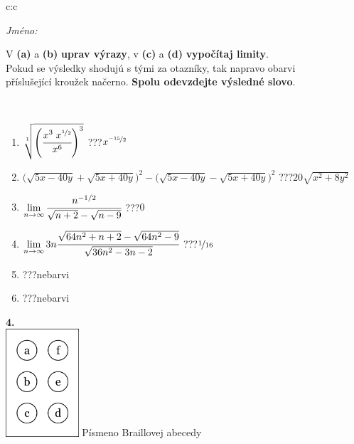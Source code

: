\documentclass[10pt]{report}
\begin{document}
\begin{tabular}{c:c}
\begin{minipage}[c][104.5mm][t]{0.5\linewidth}
\begin{center}
\textit{Jméno:}\phantom{xxxxxxxxxxxxxxxxxxxxxxxxxxxxxxxxxxxxxxxxxxxxxxxxxxxxxxxxxxxxxxxxx}\\[5mm]
\begin{minipage}{0.95\linewidth}
\begin{center}
V \textbf{(a)} a \textbf{(b)} \textbf{uprav výrazy}, v \textbf{(c)} a \textbf{(d)} \textbf{vypočítaj limity}.\\Pokud se výsledky shodujú s tými za otazníky, tak napravo obarvi\\příslušející kroužek načerno. \textbf{Spolu odevzdejte výsledné slovo}.
\end{center}
\end{minipage}
\\[1mm]
\begin{minipage}{0.79\linewidth}
\begin{center}
\begin{varwidth}{\linewidth}
\begin{enumerate}
\small
\item $\sqrt[1]{\left(\cfrac{x^{3}\;x^{\nicefrac{1}{2}}}{x^{6}}\right)^{3}}$\quad \dotfill\; ???\;\dotfill \quad $x^{\nicefrac{-15}{2}}$
\item {\footnotesize{\scriptsize$\big(\sqrt{5x-40y}+\sqrt{5x+40y}\big)^2-\big(\sqrt{5x-40y}-\sqrt{5x+40y}\big)^2$}\quad \dotfill\; ???\;\dotfill \quad $20\sqrt{x^2+8y^2}$}
\item $\lim\limits_{n\to\infty}\cfrac{n^{-1/2}}{\sqrt{n+2}-\sqrt{n-9}}$\quad \dotfill\; ???\;\dotfill \quad $0$
\item $\lim\limits_{n\to\infty}3n\cfrac{\sqrt{64n^2+n+2}-\sqrt{64n^2-9}}{\sqrt{36n^2-3n-2}}$\quad \dotfill\; ???\;\dotfill \quad $\nicefrac{1}{16}$
\item \quad \dotfill\; ???\;\dotfill \quad nebarvi
\item \quad \dotfill\; ???\;\dotfill \quad nebarvi
\end{enumerate}
\end{varwidth}
\end{center}
\end{minipage}
\begin{minipage}{0.20\linewidth}
\begin{center}
{\Huge\bfseries 4.} \\[2mm]
\includegraphics[height=40mm]{../images/braille.png}
{\small Písmeno Braillovej abecedy}
\end{center}
\end{minipage}
\end{center}
\end{minipage}
%
\end{tabular}
\end{document}
